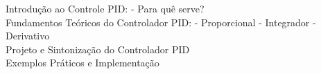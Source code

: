 \documentclass[preview]{standalone}
\begin{document}
Introdução ao Controle PID:
- Para quê serve?\\Fundamentos Teóricos do Controlador PID:
- Proporcional
- Integrador
- Derivativo\\Projeto e Sintonização do Controlador PID\\Exemplos Práticos e Implementação\\
\end{document}
